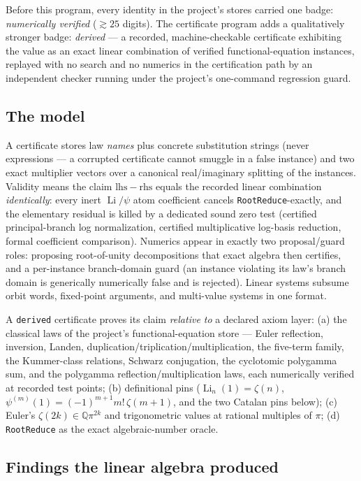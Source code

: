 \documentclass[11pt]{article}
\theoremstyle{remark}
\newcommand{\Li}{\operatorname{Li}}
\begin{document}
Before this program, every identity in the project's stores carried one badge:
\emph{numerically verified} ($\gtrsim25$ digits). The certificate program adds a
qualitatively stronger badge: \emph{derived} --- a recorded, machine-checkable certificate
exhibiting the value as an exact linear combination of verified functional-equation
instances, replayed with no search and no numerics in the certification path by an
independent checker running under the project's one-command regression guard.

\subsection{The model}

A certificate stores law \emph{names} plus concrete substitution strings (never
expressions --- a corrupted certificate cannot smuggle in a false instance) and two exact
multiplier vectors over a canonical real/imaginary splitting of the instances. Validity
means the claim $\mathrm{lhs}-\mathrm{rhs}$ equals the recorded linear combination
\emph{identically}: every inert $\Li/\psi$ atom coefficient cancels
\texttt{RootReduce}-exactly, and the elementary residual is killed by a dedicated sound
zero test (certified principal-branch log normalization, certified multiplicative
log-basis reduction, formal coefficient comparison). Numerics appear in exactly two
proposal/guard roles: proposing root-of-unity decompositions that exact algebra then
certifies, and a per-instance branch-domain guard (an instance violating its law's branch
domain is generically numerically false and is rejected). Linear systems subsume orbit
words, fixed-point arguments, and multi-value systems in one format.

A \texttt{derived} certificate proves its claim \emph{relative to} a declared axiom
layer: (a) the classical laws of the project's functional-equation store \cite{Lewin} ---
Euler reflection, inversion, Landen, duplication/triplication/multiplication, the five-term
family, the Kummer-class relations, Schwarz conjugation, the cyclotomic polygamma sum,
and the polygamma reflection/multiplication laws, each numerically verified at recorded
test points; (b) definitional pins ($\Li_n(1)=\zeta(n)$,
$\psi^{(m)}(1)=(-1)^{m+1}m!\,\zeta(m+1)$, and the two Catalan pins below); (c) Euler's
$\zeta(2k)\in\mathbb{Q}\pi^{2k}$ and trigonometric values at rational multiples of $\pi$;
(d) \texttt{RootReduce} as the exact algebraic-number oracle.

\subsection{Findings the linear algebra produced}
\end{document}
